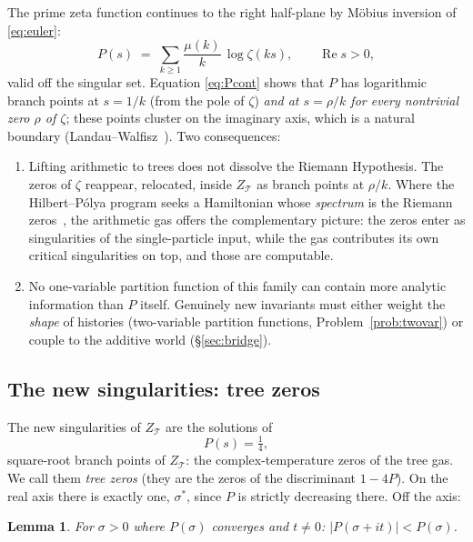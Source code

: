 \documentclass[11pt]{article}
\newcommand{\cT}{\mathcal{T}}   %
\numberwithin{equation}{section}
\theoremstyle{plain}
\newtheorem{lemma}[theorem]{Lemma}
\theoremstyle{definition}
\theoremstyle{remark}
\begin{document}
The prime zeta function continues to the right half-plane by M\"obius inversion of
\eqref{eq:euler}:
\begin{equation}\label{eq:Pcont}
P(s) \;=\; \sum_{k \ge 1} \frac{\mu(k)}{k}\, \log \zeta(ks),
\qquad \operatorname{Re} s > 0,
\end{equation}
valid off the singular set. Equation \eqref{eq:Pcont} shows that $P$ has logarithmic
branch points at $s = 1/k$ (from the pole of $\zeta$) \emph{and at $s = \rho/k$ for
every nontrivial zero $\rho$ of $\zeta$}; these points cluster on the imaginary axis,
which is a natural boundary (Landau--Walfisz~\cite{landauwalfisz}). Two consequences:

\begin{enumerate}
\item Lifting arithmetic to trees does not dissolve the Riemann Hypothesis. The
zeros of $\zeta$ reappear, relocated, inside $Z_\cT$ as branch points at $\rho/k$.
Where the Hilbert--P\'olya program seeks a Hamiltonian whose \emph{spectrum} is the
Riemann zeros~\cite{berrykeating}, the arithmetic gas offers the complementary
picture: the zeros enter as singularities of the single-particle input, while the gas
contributes its own critical singularities on top, and those are computable.
\item No one-variable partition function of this family can contain more analytic
information than $P$ itself. Genuinely new invariants must either weight the
\emph{shape} of histories (two-variable partition functions,
Problem~\ref{prob:twovar}) or couple to the additive world (\S\ref{sec:bridge}).
\end{enumerate}

\subsection{The new singularities: tree zeros}

The new singularities of $Z_\cT$ are the solutions of
\begin{equation}\label{eq:treezero}
P(s) = \tfrac14,
\end{equation}
square-root branch points of $Z_\cT$: the complex-temperature zeros of the tree gas.
We call them \emph{tree zeros} (they are the zeros of the discriminant $1 - 4P$). On
the real axis there is exactly one, $\sigma^{*}$, since $P$ is strictly decreasing
there. Off the axis:

\begin{lemma}\label{lem:strict}
For $\sigma > 0$ where $P(\sigma)$ converges and $t \neq 0$:
$|P(\sigma + it)| < P(\sigma)$.
\end{lemma}
\end{document}
